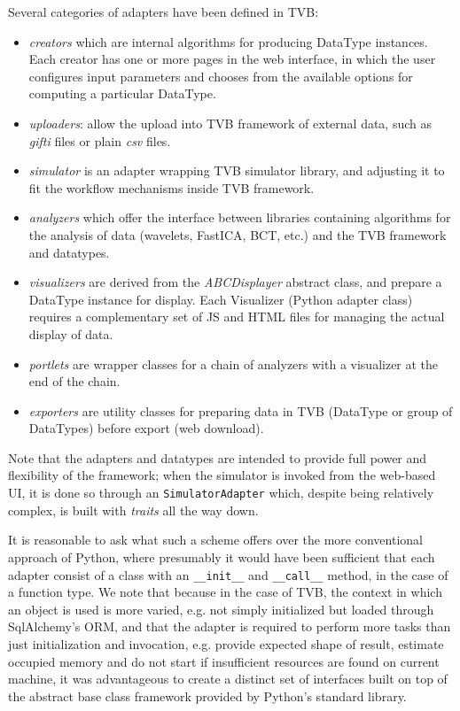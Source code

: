 Several categories of adapters have been defined in TVB: 

\begin{itemize}
	\item \textit{creators} which are internal algorithms for producing DataType instances. 
		Each creator has one or more pages in the web interface, in which the user
		 configures input parameters and chooses from the available options for computing a particular DataType.

	\item \textit{uploaders}: allow the upload into TVB framework of external data, 
    		such as \emph{gifti} files or plain \emph{csv} files.

	\item \textit{simulator} is an adapter wrapping TVB simulator library, and adjusting it to fit
		the workflow mechanisms inside TVB framework.

	\item \textit{analyzers} which offer the interface between libraries containing algorithms 
		for the analysis of data (wavelets, FastICA, BCT, etc.) and the TVB framework and datatypes.

	\item \textit{visualizers} are derived from the \emph{ABCDisplayer} abstract class, and prepare  
		a DataType instance for display. Each Visualizer (Python adapter class) requires a complementary set
		of JS and HTML files for managing the actual display of data.

	\item \textit{portlets} are wrapper classes for a chain of analyzers with a visualizer at the end of the chain.

	\item \textit{exporters} are utility classes for preparing data in TVB (DataType or group of DataTypes)
		before export (web download).
\end{itemize}

Note that the adapters and datatypes are intended to provide full 
power and flexibility of the framework; when the simulator is invoked from
the web-based UI, it is done so through an \texttt{SimulatorAdapter} which,
despite being relatively complex, is built with \emph{traits} all the way down.

It is reasonable to ask what such a scheme offers over the more 
conventional approach of Python, where presumably it would have been
sufficient that each adapter consist of a class with an \texttt{\_\_init\_\_}
and \texttt{\_\_call\_\_} method, in the case of a function type. 
We note that because in the case of TVB, the context in which an object
is used is more varied, e.g. not simply initialized but loaded through 
SqlAlchemy's ORM, and that the adapter is required to perform more tasks
than just initialization and invocation, e.g. provide expected shape of 
result, estimate occupied memory and do not start if insufficient resources are found on current machine,
 it was advantageous to create a distinct set of interfaces built on top of
the abstract base class framework provided by Python's standard library.

